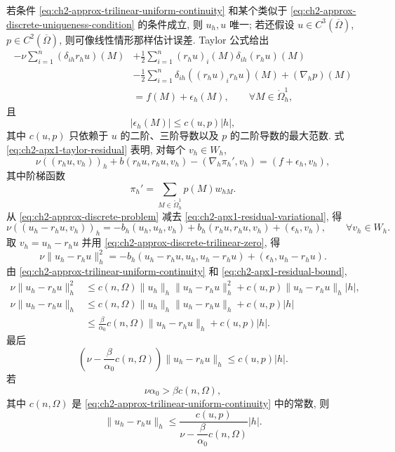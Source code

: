 \hypertarget{chapter-02-page-155}{}
若条件 \eqref{eq:ch2-approx-trilinear-uniform-continuity} 和某个类似于 \eqref{eq:ch2-approx-discrete-uniqueness-condition} 的条件成立, 则 $u_h,u$ 唯一; 若还假设 $u\in C^3(\overline\Omega)$, $p\in C^2(\overline\Omega)$, 则可像线性情形那样估计误差. Taylor 公式给出
\begin{equation}
\begin{aligned}
-\nu\sum_{i=1}^{n}(\delta_{ih}r_hu)(M)
&+\frac12\sum_{i=1}^{n}(r_hu)_i(M)\delta_{ih}(r_hu)(M)\\
&-\frac12\sum_{i=1}^{n}\delta_{ih}((r_hu)_ir_hu)(M)
+(\nabla_hp)(M)\\
&=f(M)+\epsilon_h(M),
\qquad\forall M\in\mathring\Omega_h^1,
\end{aligned}
\label{eq:ch2-apx1-taylor-residual}
\end{equation}
且
\begin{equation}
|\epsilon_h(M)|\leq c(u,p)|h|,
\label{eq:ch2-apx1-residual-bound}
\end{equation}
其中 $c(u,p)$ 只依赖于 $u$ 的二阶、三阶导数以及 $p$ 的二阶导数的最大范数. 式 \eqref{eq:ch2-apx1-taylor-residual} 表明, 对每个 $v_h\in W_h$,
\begin{equation}
\nu((r_hu,v_h))_h+b(r_hu,r_hu,v_h)-(\nabla_h\pi_h',v_h)
=(f+\epsilon_h,v_h),
\label{eq:ch2-apx1-residual-variational}
\end{equation}
其中阶梯函数
\begin{equation}
\pi_h'=\sum_{M\in\mathring\Omega_h^1}p(M)w_{hM}.
\label{eq:ch2-apx1-interpolated-pressure}
\end{equation}
从 \eqref{eq:ch2-approx-discrete-problem} 减去 \eqref{eq:ch2-apx1-residual-variational}, 得
\[
\nu((u_h-r_hu,v_h))_h
=-b_h(u_h,u_h,v_h)+b_h(r_hu,r_hu,v_h)+(\epsilon_h,v_h),
\qquad\forall v_h\in W_h.
\]
取 $v_h=u_h-r_hu$ 并用 \eqref{eq:ch2-approx-discrete-trilinear-zero}, 得
\[
\nu\lVert u_h-r_hu\rVert_h^2
=-b_h(u_h-r_hu,u_h,u_h-r_hu)+(\epsilon_h,u_h-r_hu).
\]
由 \eqref{eq:ch2-approx-trilinear-uniform-continuity} 和 \eqref{eq:ch2-apx1-residual-bound},
\[
\begin{aligned}
\nu\lVert u_h-r_hu\rVert_h^2
&\leq c(n,\Omega)\lVert u_h\rVert_h\lVert u_h-r_hu\rVert_h^2
+c(u,p)\lVert u_h-r_hu\rVert_h|h|,\\
\nu\lVert u_h-r_hu\rVert_h
&\leq c(n,\Omega)\lVert u_h\rVert_h\lVert u_h-r_hu\rVert_h+c(u,p)|h|\\
&\leq\frac\beta{\alpha_0}c(n,\Omega)\lVert u_h-r_hu\rVert_h+c(u,p)|h|.
\end{aligned}
\]
最后
\begin{equation}
\left(\nu-\frac\beta{\alpha_0}c(n,\Omega)\right)
\lVert u_h-r_hu\rVert_h\leq c(u,p)|h|.
\label{eq:ch2-apx1-error-precondition}
\end{equation}
若
\begin{equation}
\nu\alpha_0>\beta c(n,\Omega),
\label{eq:ch2-apx1-error-condition}
\end{equation}
其中 $c(n,\Omega)$ 是 \eqref{eq:ch2-approx-trilinear-uniform-continuity} 中的常数, 则
\begin{equation}
\lVert u_h-r_hu\rVert_h
\leq\frac{c(u,p)}{\nu-\dfrac\beta{\alpha_0}c(n,\Omega)}|h|.
\label{eq:ch2-apx1-error-estimate}
\end{equation}

